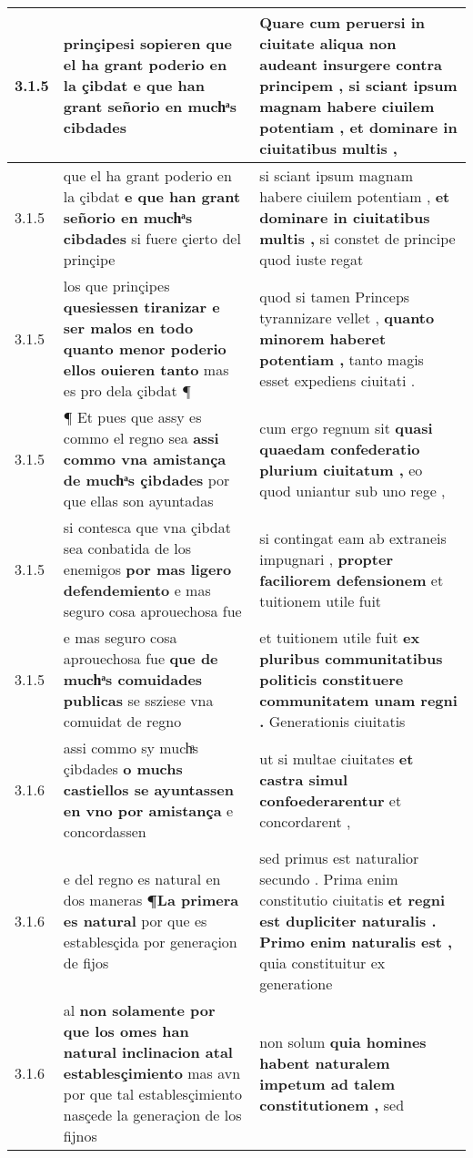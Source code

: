 \begin{tabular}{|p{1cm}|p{6.5cm}|p{6.5cm}|}
3.1.5 & prinçipesi sopieren \textbf{ que el ha grant poderio en la çibdat } e que han grant señorio en muchͣs cibdades & Quare cum peruersi in ciuitate aliqua non audeant insurgere contra principem , \textbf{ si sciant ipsum magnam habere ciuilem potentiam , } et dominare in ciuitatibus multis , \\\hline
3.1.5 & que el ha grant poderio en la çibdat \textbf{ e que han grant señorio en muchͣs cibdades } si fuere çierto del prinçipe & si sciant ipsum magnam habere ciuilem potentiam , \textbf{ et dominare in ciuitatibus multis , } si constet de principe quod iuste regat \\\hline
3.1.5 & los que prinçipes \textbf{ quesiessen tiranizar e ser malos en todo quanto menor poderio ellos ouieren tanto } mas es pro dela çibdat ¶ & quod si tamen Princeps tyrannizare vellet , \textbf{ quanto minorem haberet potentiam , } tanto magis esset expediens ciuitati . \\\hline
3.1.5 & ¶ Et pues que assy es commo el regno sea \textbf{ assi commo vna amistança de muchͣs çibdades } por que ellas son ayuntadas & cum ergo regnum sit \textbf{ quasi quaedam confederatio plurium ciuitatum , } eo quod uniantur sub uno rege , \\\hline
3.1.5 & si contesca que vna çibdat sea conbatida de los enemigos \textbf{ por mas ligero defendemiento } e mas seguro cosa aprouechosa fue & si contingat eam ab extraneis impugnari , \textbf{ propter faciliorem defensionem } et tuitionem utile fuit \\\hline
3.1.5 & e mas seguro cosa aprouechosa fue \textbf{ que de muchͣs comuidades publicas } se ssziese vna comuidat de regno & et tuitionem utile fuit \textbf{ ex pluribus communitatibus politicis constituere communitatem unam regni . } Generationis ciuitatis \\\hline
3.1.6 & assi commo sy muchͣs çibdades \textbf{ o muchs castiellos se ayuntassen en vno por amistança } e concordassen & ut si multae ciuitates \textbf{ et castra simul confoederarentur } et concordarent , \\\hline
3.1.6 & e del regno es natural en dos maneras \textbf{ ¶La primera es natural } por que es establesçida por generaçion de fijos & sed primus est naturalior secundo . Prima enim constitutio ciuitatis \textbf{ et regni est dupliciter naturalis . Primo enim naturalis est , } quia constituitur ex generatione \\\hline
3.1.6 & al \textbf{ non solamente por que los omes han natural inclinacion atal establesçimiento } mas avn por que tal establesçimiento nasçede la generaçion de los fijnos & non solum \textbf{ quia homines habent naturalem impetum ad talem constitutionem , } sed \\\hline

\end{tabular}
